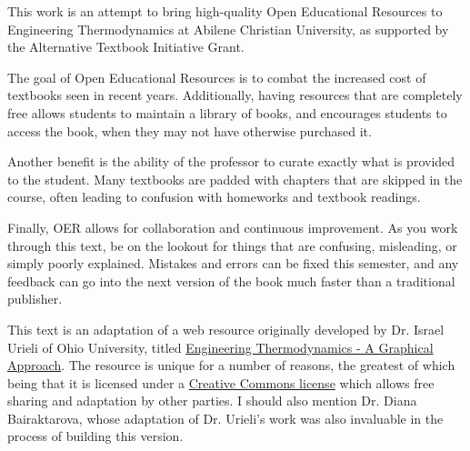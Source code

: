 This work is an attempt to bring high-quality Open Educational Resources to Engineering Thermodynamics at Abilene Christian University, as supported by the Alternative Textbook Initiative Grant.

The goal of Open Educational Resources is to combat the increased cost of textbooks seen in recent years.  Additionally, having resources that are completely free allows students to maintain a library of books, and encourages students to access the book, when they may not have otherwise purchased it.

Another benefit is the ability of the professor to curate exactly what is provided to the student.  Many textbooks are padded with chapters that are skipped in the course, often leading to confusion with homeworks and textbook readings.

Finally, OER allows for collaboration and continuous improvement.  As you work through this text, be on the lookout for things that are confusing, misleading, or simply poorly explained.  Mistakes and errors can be fixed this semester, and any feedback can go into the next version of the book much faster than a traditional publisher.

This text is an adaptation of a web resource originally developed by Dr. Israel Urieli of Ohio University, titled \href{https://www.ohio.edu/mechanical/thermo/}{Engineering Thermodynamics - A Graphical Approach}.  The resource is unique for a number of reasons, the greatest of which being that it is licensed under a \href{https://creativecommons.org/licenses/by-nc-sa/3.0/us/}{Creative Commons license} which allows free sharing and adaptation by other parties.  I should also mention Dr. Diana Bairaktarova, whose adaptation of Dr. Urieli's work was also invaluable in the process of building this version.
